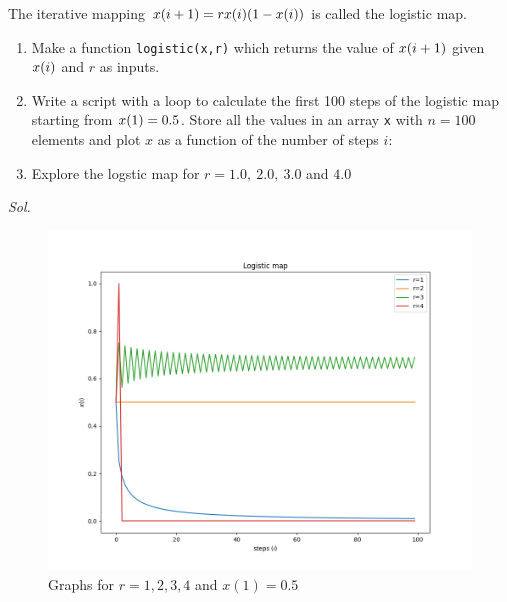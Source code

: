     \begin{problem}\label{problem_2.8}
        The iterative mapping $x\qty(i+1)=rx\qty(i) \qty(1-x\qty(i))$ is called the logistic map.
        \begin{enumerate}
            \item Make a function \verb|logistic(x,r)| which returns the value of $x\qty(i+1)$ given $x\qty(i)$ and $r$ as inputs.
            \item Write a script with a loop to calculate the first 100 steps of the logistic map starting from $x\qty(1)=0.5$. Store all the values in an array \verb|x| with $n=100$ elements and plot $x$ as a function of the number of steps $i$:
            \item Explore the logstic map for $r=1.0, \ 2.0, \ 3.0$ and $4.0$
        \end{enumerate}
    \end{problem}
    \textit{ Sol. }
    
    \begin{figure}[h!]
        \centering
        \includegraphics[width=0.85\linewidth]{img/chapter2/2-8/2_8_logistic_map.png}
        \caption{Graphs for $r=1,2,3,4$ and $x(1)=0.5$}
        \label{fig:problem 2-8}
    \end{figure}
    


